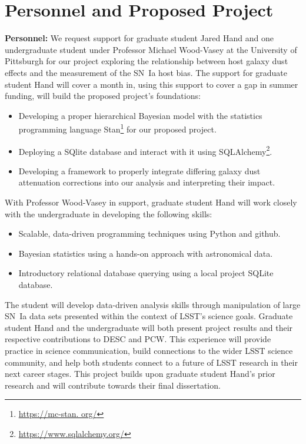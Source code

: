 \documentclass[modern]{aastex63}
\begin{document}
\section{Personnel and Proposed Project}
{\bf Personnel:}
We request support for graduate student Jared Hand and one undergraduate student under Professor Michael Wood-Vasey at the University of Pittsburgh for our project exploring the relationship between host galaxy dust effects and the measurement of the SN~Ia host bias.
The support for graduate student Hand will cover a month in, using this support to cover a gap in summer funding, will build the proposed project's foundations:
\begin{itemize}
    \item Developing a proper hierarchical Bayesian model with the statistics programming language Stan\footnote{\url{https://mc-stan.
    org/}} for our proposed project.
    \item Deploying a SQlite database and interact with it using SQLAlchemy\footnote{\url{https://www.sqlalchemy.org/}}.
    \item Developing a framework to properly integrate differing galaxy dust attenuation corrections into our analysis and interpreting their impact.
\end{itemize}
With Professor Wood-Vasey in support, graduate student Hand will work closely with the undergraduate in developing the following skills:
\begin{itemize}
    \item Scalable, data-driven programming techniques using Python and github.
    \item Bayesian statistics using a hands-on approach with astronomical data. 
    \item Introductory relational database querying using a local project SQLite database.
\end{itemize}
The student will develop data-driven analysis skills through manipulation of large SN~Ia data sets presented within the context of LSST's science goals.
Graduate student Hand and the undergraduate will both present project results and their respective contributions to DESC and PCW.
This experience will provide practice in science communication, build connections to the wider LSST science community, and help both students connect to a future of LSST research in their next career stages.
This project builds upon graduate student Hand's prior research \citep{Hand2021} and will contribute towards their final dissertation.
\end{document}
